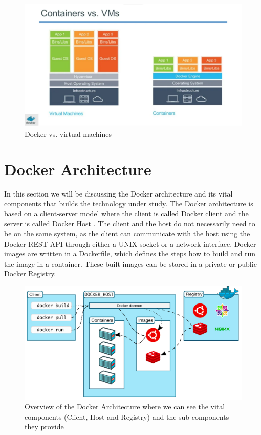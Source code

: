 \documentclass[fleqn,12pt]{olplainarticle}
\begin{document}
\begin{figure}[h]
    \centering
    \includegraphics[width=1\textwidth]{docker_vs_vm.png}
    \caption{Docker vs. virtual machines \cite{docker:vs_vm}}
    \label{fig:overview}
\end{figure}

\section{Docker Architecture}

In this section we will be discussing the Docker architecture and its vital components that builds the technology under study. The Docker architecture is based on a client-server model where the client is called Docker client and the server is called Docker Host \citep{docker:overview, aquasec:docker_architecture}. The client and the host do not necessarily need to be on the same system, as the client can communicate with the host using the Docker REST API through either a UNIX socket or a network interface. Docker images are written in a Dockerfile, which defines the steps how to build and run the image in a container. These built images can be stored in a private or public Docker Registry.

\begin{figure}[h]
    \centering
    \includegraphics[width=1\textwidth]{docker-overview}
    \caption{Overview of the Docker Architecture where we can see the vital components (Client, Host and Registry) and the sub components they provide \citep{docker:overview}}
    \label{fig:overview}
\end{figure}
\end{document}
